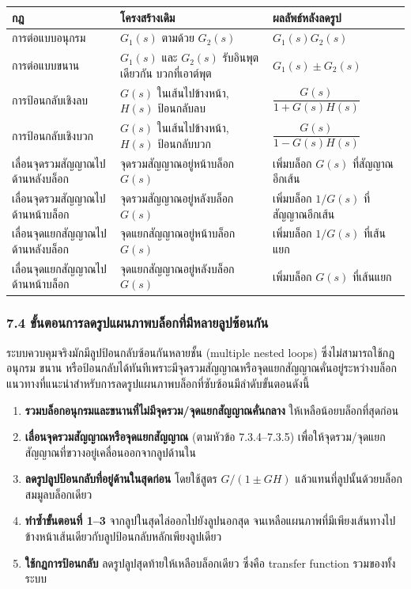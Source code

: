 \begin{table}[htbp]
    \centering
    \begin{tabularx}{\textwidth}{L{0.23\textwidth} Y Y}
        \hline
        \textbf{กฎ} & \textbf{โครงสร้างเดิม} & \textbf{ผลลัพธ์หลังลดรูป} \\
        \hline
        การต่อแบบอนุกรม & $G_1(s)$ ตามด้วย $G_2(s)$ & $G_1(s)G_2(s)$ \\
        การต่อแบบขนาน & $G_1(s)$ และ $G_2(s)$ รับอินพุตเดียวกัน บวกที่เอาต์พุต & $G_1(s) \pm G_2(s)$ \\
        การป้อนกลับเชิงลบ & $G(s)$ ในเส้นไปข้างหน้า, $H(s)$ ป้อนกลับลบ & $\dfrac{G(s)}{1+G(s)H(s)}$ \\
        การป้อนกลับเชิงบวก & $G(s)$ ในเส้นไปข้างหน้า, $H(s)$ ป้อนกลับบวก & $\dfrac{G(s)}{1-G(s)H(s)}$ \\
        เลื่อนจุดรวมสัญญาณไปด้านหลังบล็อก & จุดรวมสัญญาณอยู่หน้าบล็อก $G(s)$ & เพิ่มบล็อก $G(s)$ ที่สัญญาณอีกเส้น \\
        เลื่อนจุดรวมสัญญาณไปด้านหน้าบล็อก & จุดรวมสัญญาณอยู่หลังบล็อก $G(s)$ & เพิ่มบล็อก $1/G(s)$ ที่สัญญาณอีกเส้น \\
        เลื่อนจุดแยกสัญญาณไปด้านหลังบล็อก & จุดแยกสัญญาณอยู่หน้าบล็อก $G(s)$ & เพิ่มบล็อก $1/G(s)$ ที่เส้นแยก \\
        เลื่อนจุดแยกสัญญาณไปด้านหน้าบล็อก & จุดแยกสัญญาณอยู่หลังบล็อก $G(s)$ & เพิ่มบล็อก $G(s)$ ที่เส้นแยก \\
        \hline
    \end{tabularx}
\end{table}


\subsubsection{7.4 ขั้นตอนการลดรูปแผนภาพบล็อกที่มีหลายลูปซ้อนกัน}

ระบบควบคุมจริงมักมีลูปป้อนกลับซ้อนกันหลายชั้น (multiple nested loops) ซึ่งไม่สามารถใช้กฎอนุกรม ขนาน หรือป้อนกลับได้ทันทีเพราะมีจุดรวมสัญญาณหรือจุดแยกสัญญาณคั่นอยู่ระหว่างบล็อก แนวทางที่แนะนำสำหรับการลดรูปแผนภาพบล็อกที่ซับซ้อนมีลำดับขั้นตอนดังนี้

\begin{enumerate}
    \item \textbf{รวมบล็อกอนุกรมและขนานที่ไม่มีจุดรวม/จุดแยกสัญญาณคั่นกลาง} ให้เหลือน้อยบล็อกที่สุดก่อน
    \item \textbf{เลื่อนจุดรวมสัญญาณหรือจุดแยกสัญญาณ} (ตามหัวข้อ 7.3.4–7.3.5) เพื่อให้จุดรวม/จุดแยกสัญญาณที่ขวางอยู่เคลื่อนออกจากลูปด้านใน
    \item \textbf{ลดรูปลูปป้อนกลับที่อยู่ด้านในสุดก่อน} โดยใช้สูตร $G/(1\pm GH)$ แล้วแทนที่ลูปนั้นด้วยบล็อกสมมูลบล็อกเดียว
    \item \textbf{ทำซ้ำขั้นตอนที่ 1–3} จากลูปในสุดไล่ออกไปยังลูปนอกสุด จนเหลือแผนภาพที่มีเพียงเส้นทางไปข้างหน้าเส้นเดียวกับลูปป้อนกลับหลักเพียงลูปเดียว
    \item \textbf{ใช้กฎการป้อนกลับ} ลดรูปลูปสุดท้ายให้เหลือบล็อกเดียว ซึ่งคือ transfer function รวมของทั้งระบบ
\end{enumerate}

